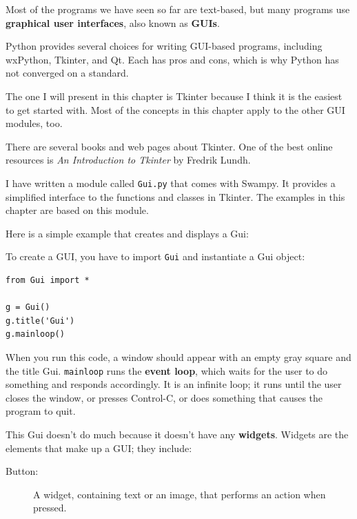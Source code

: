 \documentclass[10pt]{book}
\begin{document}
{Most of the programs we have seen so far are text-based, but
many programs use {\bf graphical user interfaces}, also
known as {\bf GUIs}.


Python provides several choices for writing GUI-based programs,
including wxPython, Tkinter, and Qt.  Each has pros and cons, which
is why Python has not converged on a standard.

The one I will present in this chapter is Tkinter because I think
it is the easiest to get started with.  Most of the concepts
in this chapter apply to the other GUI modules, too.

There are several books and web pages about Tkinter.  One of
the best online resources is {\em An Introduction to Tkinter}
by Fredrik Lundh.


I have written a module called {\tt Gui.py} that comes with
Swampy.  It provides a simplified interface to the functions
and classes in Tkinter.  The examples in this chapter are
based on this module.

Here is a simple example that creates and displays a Gui:

To create a GUI, you have to import {\tt Gui} and instantiate
a Gui object:

\beforeverb
\begin{verbatim}
from Gui import *

g = Gui()
g.title('Gui')
g.mainloop()
\end{verbatim}
\afterverb
%
When you run this code, a window should appear with an empty gray
square and the title {\sf Gui}.  {\tt mainloop} runs the {\bf event
  loop}, which waits for the user to do something and responds
accordingly.  It is an infinite loop; it runs until the user closes
the window, or presses Control-C, or does something that causes the
program to quit.


This Gui doesn't do much because it doesn't have any
{\bf widgets}.  Widgets are the elements that make up a
GUI; they include:


\begin{description}

\item[Button:] A widget, containing text or an image, that
performs an action when pressed.


\end{description}}
\end{document}
